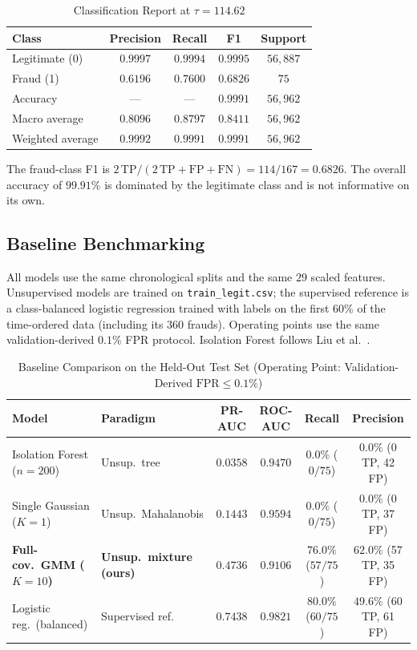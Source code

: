 \documentclass[conference]{IEEEtran}
\begin{document}
\begin{table}[!t]
\centering
\caption{Classification Report at $\tau = 114.62$}
\renewcommand{\arraystretch}{1.15}
\footnotesize
\setlength{\tabcolsep}{3pt}
\begin{tabular}{lcccc}
\toprule
\textbf{Class} & \textbf{Precision} & \textbf{Recall} & \textbf{F1} & \textbf{Support} \\
\midrule
Legitimate (0) & $0.9997$ & $0.9994$ & $0.9995$ & $56{,}887$ \\
Fraud (1) & $0.6196$ & $0.7600$ & $0.6826$ & $75$ \\
Accuracy & --- & --- & $0.9991$ & $56{,}962$ \\
Macro average & $0.8096$ & $0.8797$ & $0.8411$ & $56{,}962$ \\
Weighted average & $0.9992$ & $0.9991$ & $0.9991$ & $56{,}962$ \\
\bottomrule
\end{tabular}
\label{tab:classreport}
\end{table}

The fraud-class F1 is $2\,\text{TP}/(2\,\text{TP}+\text{FP}+\text{FN}) = 114/167 = 0.6826$. The overall accuracy of $99.91\%$ is dominated by the legitimate class and is not informative on its own.

\subsection{Baseline Benchmarking}
\label{sec:baselines}
All models use the same chronological splits and the same $29$ scaled features. Unsupervised models are trained on \texttt{train\_legit.csv}; the supervised reference is a class-balanced logistic regression trained with labels on the first $60\%$ of the time-ordered data (including its $360$ frauds). Operating points use the same validation-derived $0.1\%$ FPR protocol. Isolation Forest follows Liu et al.\ \cite{liu2008}.

\begin{table}[!t]
\centering
\caption{Baseline Comparison on the Held-Out Test Set (Operating Point: Validation-Derived $\text{FPR} \le 0.1\%$)}
\renewcommand{\arraystretch}{1.15}
\small
\begin{tabular}{llcccc}
\toprule
\textbf{Model} & \textbf{Paradigm} & \textbf{PR-AUC} & \textbf{ROC-AUC} & \textbf{Recall} & \textbf{Precision} \\
\midrule
Isolation Forest ($n=200$) & Unsup.\ tree & $0.0358$ & $0.9470$ & $0.0\%$ ($0/75$) & $0.0\%$ (0 TP, 42 FP) \\
Single Gaussian ($K=1$) & Unsup.\ Mahalanobis & $0.1443$ & $0.9594$ & $0.0\%$ ($0/75$) & $0.0\%$ (0 TP, 37 FP) \\
\textbf{Full-cov.\ GMM ($K=10$)} & \textbf{Unsup.\ mixture (ours)} & $\mathbf{0.4736}$ & $0.9106$ & $\mathbf{76.0\%}$ ($57/75$) & $\mathbf{62.0\%}$ (57 TP, 35 FP) \\
Logistic reg.\ (balanced) & Supervised ref. & $0.7438$ & $0.9821$ & $80.0\%$ ($60/75$) & $49.6\%$ (60 TP, 61 FP) \\
\bottomrule
\end{tabular}
\label{tab:baselines}
\end{table}
\end{document}
